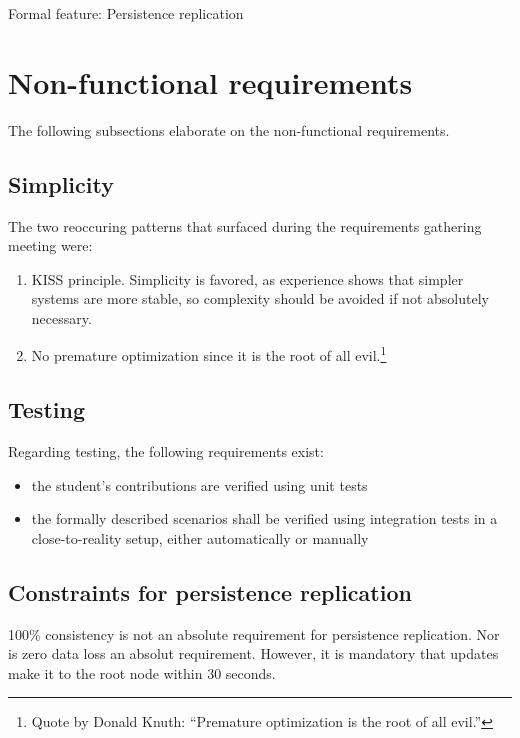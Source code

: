 \begin{listing}
	\inputminted{Gherkin}{listings/features/persistence_synchronization.feature}
	\caption{Formal feature: Persistence replication}
	\label{lst:feature:persistence_synchronization}
\end{listing}

\section{Non-functional requirements}\label{sec:nfr}
The following subsections elaborate on the non-functional requirements.

\subsection{Simplicity}
The two reoccuring patterns that surfaced during the requirements gathering
meeting were:

\begin{enumerate}
\item \gls{KISS} principle. Simplicity is favored, as experience shows that
	simpler systems are more stable, so complexity should be avoided if not
	absolutely necessary.

\item No premature optimization since it is the root of all evil.\footnote{Quote
	by Donald Knuth: ``Premature optimization is the root of all evil.''}
\end{enumerate}


\subsection{Testing}
Regarding testing, the following requirements exist:
\begin{itemize}
	\item the student's contributions are verified using unit tests
	\item the formally described scenarios shall be verified using
		integration tests in a close-to-reality setup, either
		automatically or manually
\end{itemize}

\subsection{Constraints for persistence replication}
100\% consistency is not an absolute requirement for persistence replication.
Nor is zero data loss an absolut requirement. However, it is mandatory that
updates make it to the root node within 30 seconds.

